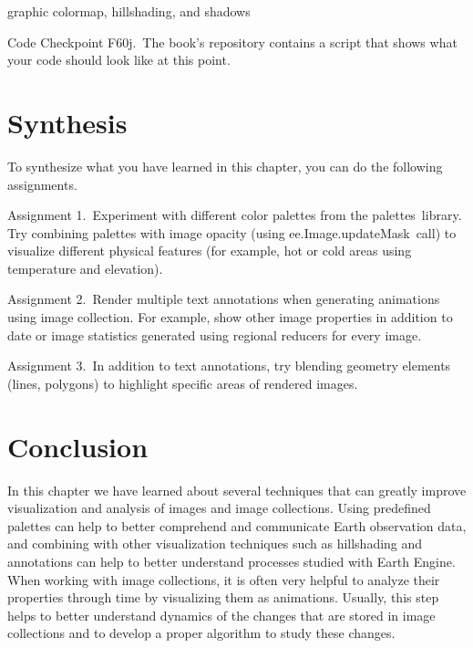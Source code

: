 \documentclass[
  letterpaper,
  DIV=11,
  numbers=noendperiod]{scrreprt}
\begin{document}
\begin{enumerate}
graphic colormap, hillshading, and shadows
\end{enumerate}

\begin{tcolorbox}[enhanced jigsaw, left=2mm, breakable, rightrule=.15mm, opacityback=0, colframe=quarto-callout-note-color-frame, colbacktitle=quarto-callout-note-color!10!white, arc=.35mm, opacitybacktitle=0.6, toptitle=1mm, colback=white, leftrule=.75mm, title=\textcolor{quarto-callout-note-color}{\faInfo}\hspace{0.5em}{Note}, toprule=.15mm, bottomtitle=1mm, titlerule=0mm, bottomrule=.15mm, coltitle=black]

Code Checkpoint F60j.~The book's repository contains a script that shows
what your code should look like at this point.

\end{tcolorbox}

\hypertarget{synthesis-17}{%
\section*{Synthesis}\label{synthesis-17}}


To synthesize what you have learned in this chapter, you can do the
following assignments.

Assignment 1.~Experiment with different color palettes from the
palettes~library. Try combining palettes with image opacity (using
ee.Image.updateMask~call) to visualize different physical features (for
example, hot or cold areas using temperature and elevation).

Assignment 2.~Render multiple text annotations when generating
animations using image collection. For example, show other image
properties in addition to date or image statistics generated using
regional reducers for every image.

Assignment 3.~In addition to text annotations, try blending geometry
elements (lines, polygons) to highlight specific areas of rendered
images.

\hypertarget{conclusion-21}{%
\section*{Conclusion}\label{conclusion-21}}


In this chapter we have learned about several techniques that can
greatly improve visualization and analysis of images and image
collections. Using predefined palettes can help to better comprehend and
communicate Earth observation data, and combining with other
visualization techniques such as hillshading and annotations can help to
better understand processes studied with Earth Engine. When working with
image collections, it is often very helpful to analyze their properties
through time by visualizing them as animations. Usually, this step helps
to better understand dynamics of the changes that are stored in image
collections and to develop a proper algorithm to study these changes.
\end{document}
